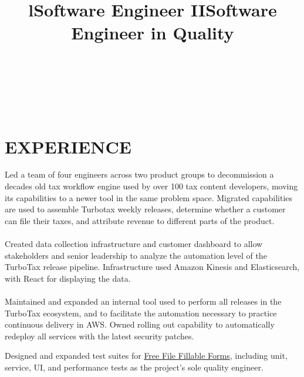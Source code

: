 \documentclass[margin]{res}
\begin{document}
\begin{resume}

\begin{format}
\title{l}\\
\\
\body\\
\end{format}

\section{EXPERIENCE}

\title{\textbf{Software Engineer II}}
\begin{position}
Led a team of four engineers across two product groups to decommission a decades old tax workflow engine used by over 100 tax content developers, moving its capabilities to a newer tool in the same problem space. Migrated capabilities are used to assemble Turbotax weekly releases, determine whether a customer can file their taxes, and attribute revenue to different parts of the product.
\\
\\
Created data collection infrastructure and customer dashboard to allow stakeholders and senior leadership to analyze the automation level of the TurboTax release pipeline. Infrastructure used Amazon Kinesis and Elasticsearch, with React for displaying the data.
\\
\\
Maintained and expanded an internal tool used to perform all releases in the TurboTax ecosystem, and to facilitate the automation necessary to practice continuous delivery in AWS. Owned rolling out capability to automatically redeploy all services with the latest security patches.
\end{position}

\title{\textbf{Software Engineer in Quality}}
\begin{position}
Designed and expanded test suites for \href{https://www.freefilefillableforms.com}{Free File Fillable Forms}, including unit, service, UI, and performance tests as the project's sole quality engineer.
\end{position}


\end{resume}
\end{document}
